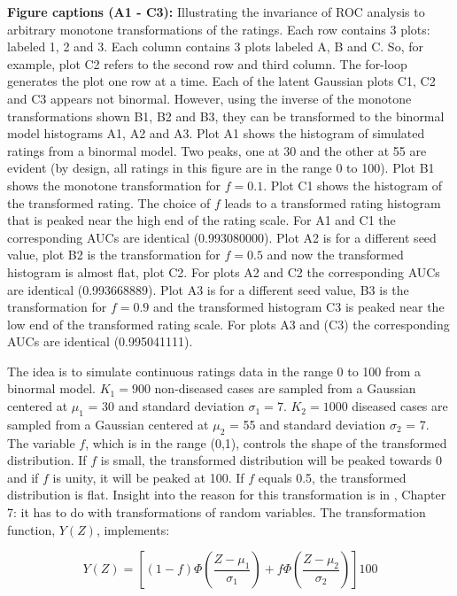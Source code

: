 \documentclass[
]{book}
\begin{document}
\textbf{Figure captions (A1 - C3):} Illustrating the invariance of ROC analysis to arbitrary monotone transformations of the ratings. Each row contains 3 plots: labeled 1, 2 and 3. Each column contains 3 plots labeled A, B and C. So, for example, plot C2 refers to the second row and third column. The for-loop generates the plot one row at a time. Each of the latent Gaussian plots C1, C2 and C3 appears not binormal. However, using the inverse of the monotone transformations shown B1, B2 and B3, they can be transformed to the binormal model histograms A1, A2 and A3. Plot A1 shows the histogram of simulated ratings from a binormal model. Two peaks, one at 30 and the other at 55 are evident (by design, all ratings in this figure are in the range 0 to 100). Plot B1 shows the monotone transformation for \(f = 0.1\). Plot C1 shows the histogram of the transformed rating. The choice of \(f\) leads to a transformed rating histogram that is peaked near the high end of the rating scale. For A1 and C1 the corresponding AUCs are identical (0.993080000). Plot A2 is for a different seed value, plot B2 is the transformation for \(f = 0.5\) and now the transformed histogram is almost flat, plot C2. For plots A2 and C2 the corresponding AUCs are identical (0.993668889). Plot A3 is for a different seed value, B3 is the transformation for \(f = 0.9\) and the transformed histogram C3 is peaked near the low end of the transformed rating scale. For plots A3 and (C3) the corresponding AUCs are identical (0.995041111).

The idea is to simulate continuous ratings data in the range 0 to 100 from a binormal model. \(K_1 = 900\) non-diseased cases are sampled from a Gaussian centered at \(\mu_1\) = 30 and standard deviation \(\sigma_1 = 7\). \(K_2 = 1000\) diseased cases are sampled from a Gaussian centered at \(\mu_2\) = 55 and standard deviation \(\sigma_2\) = 7. The variable \(f\), which is in the range (0,1), controls the shape of the transformed distribution. If \(f\) is small, the transformed distribution will be peaked towards 0 and if \(f\) is unity, it will be peaked at 100. If \(f\) equals 0.5, the transformed distribution is flat. Insight into the reason for this transformation is in \citep{RN300}, Chapter 7: it has to do with transformations of random variables. The transformation function, \(Y(Z)\), implements:

\begin{equation} 
Y\left ( Z \right )=\left [ \left ( 1-f \right )\Phi\left ( \frac{Z-\mu_1}{\sigma_1} \right )+f\Phi\left ( \frac{Z-\mu_2}{\sigma_2} \right ) \right ]100
\label{eq:binormal-modelDemoMisconception}
\end{equation}
\end{document}
